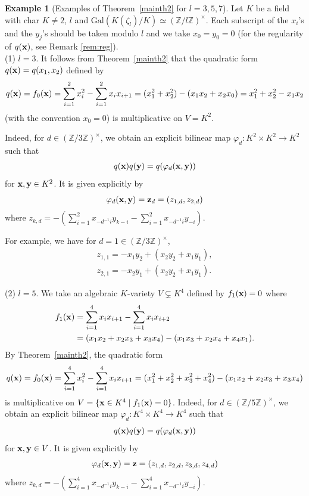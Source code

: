 \documentclass[a4paper, 11pt]{amsart}
\newcommand{\Z}{\mathbb Z}
\newcommand{\Gal}{\mathrm{Gal}}
\theoremstyle{plain}
\theoremstyle{definition}
\newtheorem{example}[thm]{Example}
\numberwithin{equation}{section}
\begin{document}
\begin{example}[Examples of Theorem~\ref{mainth2} for $l=3,5,7$]\label{ex:mainth2}
Let $K$ be a field with char $K\neq 2$, $l$ and 
$\Gal(K(\zeta_l)/K)\simeq (\Z/l\Z)^{\times}$. 
Each subscript of the $x_i$'s and the $y_j$'s 
should be taken modulo $l$
and we take $x_0=y_0=0$ 
(for the regularity of $q({\bf x})$, see Remark \ref{rem:reg}).\\ 

(1) $l=3$. It follows from Theorem~\ref{mainth2} that 
the quadratic form $q({\bf x})=q(x_1,x_{2})$ defined by
\[
q({\bf x})=f_0({\bf x})
=\sum_{i=1}^{2}x_i^2-\sum_{i=1}^{2}x_ix_{i+1}
=(x_1^2+x_2^2) - (x_1x_2+x_2x_0)
=x_1^2+x_2^2 - x_1x_2
\]
(with the convention $x_0=0$) is multiplicative on $V=K^2$. 

Indeed, for $d \in (\Z/3\Z)^\times$, 
we obtain an explicit bilinear map $\varphi_d :K^2 \times K^2 \rightarrow K^2$ such that 
\begin{align*}
q({\bf x})q({\bf y})=q(\varphi_d ({\bf x}, {\bf y}))
\end{align*}
for ${\bf x},{\bf y} \in K^2$.
It is given explicitly by
\[
\varphi_d ({\bf x}, {\bf y})
={\bf z}_d
= (z_{1,d}, z_{2,d})
\]
where $z_{k,d}=-\left(\sum_{i=1}^{2}x_{-d^{-1}i}y_{k-i} - \sum_{i=1}^{2}x_{-d^{-1}i}y_{-i}\right)$.

For example, we have for $d=1 \in (\Z/3\Z)^\times$,
\begin{align*}
z_{1,1}
=- x_1y_2 + (x_2y_2 + x_1y_1),\\
z_{2,1}
=-x_2y_1+(x_2y_2 + x_1y_1).
\end{align*}

(2) $l=5$. 
We take an algebraic $K$-variety $V \subsetneq K^4$ defined by
$f_1({\bf x})=0$
where
\begin{align*}
f_1({\bf x})
&=\sum_{i=1}^{4}x_ix_{i+1}-\sum_{i=1}^{4}x_ix_{i+2}\\
&=(x_1x_2 + x_2x_3 + x_3x_4) - (x_1x_3 + x_2x_4 + x_4x_1).
\end{align*}
By Theorem~\ref{mainth2}, the quadratic form 
\begin{align*}
q({\bf x})=f_0({\bf x})
=\sum_{i=1}^{4}x_i^2-\sum_{i=1}^{4}x_ix_{i+1}
=(x_1^2+x_2^2+x_3^2+x_4^2) - (x_1x_2+x_2x_3 + x_3x_4)
\end{align*}
is multiplicative on $V=\{{\bf x}\in K^4\mid f_1({\bf x})=0\}$. 
Indeed, for $d \in (\Z/5\Z)^\times$, we obtain an explicit bilinear map  $\varphi_d :K^4 \times K^4 \rightarrow K^4$ such that 
\begin{align*}
q({\bf x})q({\bf y})=q(\varphi_d ({\bf x}, {\bf y}))
\end{align*}
for ${\bf x},{\bf y} \in V$.
It is given explicitly by
\[
\varphi_d ({\bf x}, {\bf y})
={\bf z}
= (z_{1,d}, z_{2,d}, z_{3,d}, z_{4,d})
\]
where $z_{k,d}=-\left(\sum_{i=1}^{4}x_{-d^{-1}i}y_{k-i} - \sum_{i=1}^{4}x_{-d^{-1}i}y_{-i}\right)$.


\end{example}
\end{document}

